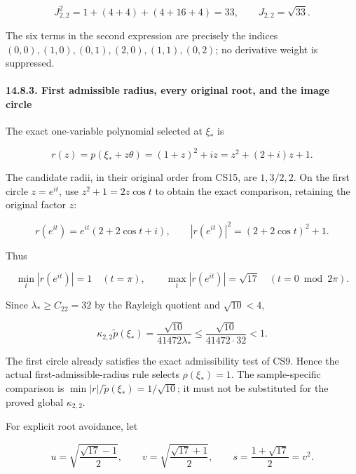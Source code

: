 \documentclass[
  11pt,
]{article}
\makeatletter
\let\ReaderOriginalAnchorStart\hyper@anchorstart
\let\ReaderOriginalAnchorEnd\hyper@anchorend
\let\ReaderPendingAliases\@empty
\def\ReaderArmAliases#1{\gdef\ReaderPendingAliases{#1}}
\def\hyper@anchorstart#1{\ReaderIfNativeAnchorTF{#1}{\ReaderPendingAliases\global\let\ReaderPendingAliases\@empty}{}\ReaderOriginalAnchorStart{#1}}
\makeatother
\begin{document}
\[
 J_{2,2}^2=1+(4+4)+(4+16+4)=33,
 \qquad J_{2,2}=\sqrt{33}.                                   \tag{CE11}
\]

The six terms in the second expression are precisely the indices
\((0,0),(1,0),(0,1),(2,0),(1,1),(0,2)\); no derivative weight is
suppressed.

\ReaderArmAliases{\ReaderOriginalAnchorStart{first-admissible-radius-every-original-root-and-the-image-circle}\ReaderOriginalAnchorEnd}
\paragraph{14.8.3. First admissible radius, every original root, and the
image
circle}\label{first-admissible-radius-every-original-root-and-the-image-circle}

The exact one-variable polynomial selected at \(\xi_*\) is

\[
 r(z)=p(\xi_*+z\theta)=(1+z)^2+iz
      =z^2+(2+i)z+1.                                        \tag{CE12}
\]

The candidate radii, in their original order from CS15, are \(1,3/2,2\).
On the first circle \(z=e^{it}\), use \(z^2+1=2z\cos t\) to obtain the
exact comparison, retaining the original factor \(z\):

\[
 r(e^{it})=e^{it}(2+2\cos t+i),
 \qquad
 |r(e^{it})|^2=(2+2\cos t)^2+1.                              \tag{CE13}
\]

Thus

\[
 \min_t|r(e^{it})|=1\quad(t=\pi),\qquad
 \max_t|r(e^{it})|=\sqrt{17}\quad(t=0\bmod2\pi).              \tag{CE14}
\]

Since \(\lambda_*\geq C_{22}=32\) by the Rayleigh quotient and
\(\sqrt{10}<4\),

\[
 \kappa_{2,2}\widetilde p(\xi_*)
   =\frac{\sqrt{10}}{41472\lambda_*}
   \leq\frac{\sqrt{10}}{41472\cdot32}<1.                     \tag{CE15}
\]

The first circle already satisfies the exact admissibility test of CS9.
Hence the actual first-admissible-radius rule selects \(\rho(\xi_*)=1\).
The sample-specific comparison is
\(\min|r|/\widetilde p(\xi_*)=1/\sqrt{10}\); it must not be substituted
for the proved global \(\kappa_{2,2}\).

For explicit root avoidance, let

\[
 u=\sqrt{\frac{\sqrt{17}-1}{2}},\qquad
 v=\sqrt{\frac{\sqrt{17}+1}{2}},\qquad
 s=\frac{1+\sqrt{17}}2=v^2.                                  \tag{CE16}
\]
\end{document}
